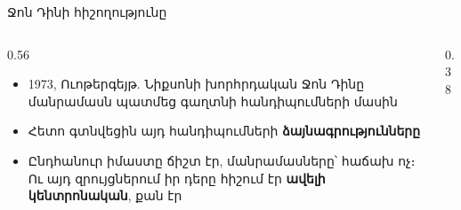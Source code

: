 \begin{frame}{Ջոն Դինի հիշողությունը}
  \begin{columns}[c]
    \begin{column}{0.56\textwidth}
      \begin{itemize}
        \item 1973, Ուոթերգեյթ. Նիքսոնի խորհրդական Ջոն Դինը մանրամասն պատմեց գաղտնի հանդիպումների մասին
        \item<2-> Հետո գտնվեցին այդ հանդիպումների \textbf{ձայնագրությունները} 
        \item<3-> Ընդհանուր իմաստը ճիշտ էր, մանրամասները՝ հաճախ ոչ։ Ու այդ զրույցներում իր դերը հիշում էր \textbf{ավելի կենտրոնական}, քան էր
      \end{itemize}
    \end{column}
    \begin{column}{0.38\textwidth}
      \centering
      \par\medskip
    \end{column}
  \end{columns}
\end{frame}

